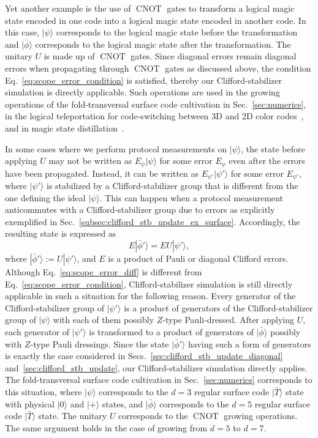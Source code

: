 \documentclass[
 reprint,
 amsmath,amssymb,
 pra,superscriptaddress, nofootinbib
]{revtex4-2}
\theoremstyle{definition}
\theoremstyle{plain}
\newcommand{\CNOT}{\operatorname{CNOT}}
\begin{document}
Yet another example is the use of $\CNOT$ gates to transform a logical magic state encoded in one code into a logical magic state encoded in another code. 
In this case, $|\psi\rangle$ corresponds to the logical magic state before the transformation and $|\bar{\phi}\rangle$ corresponds to the logical magic state after the transformation. The unitary $U$ is made up of $\CNOT$ gates.
Since diagonal errors remain diagonal errors when propagating through $\CNOT$ gates as discussed above, the condition Eq.~\eqref{eq:scope_error_condition} is satisfied, thereby our Clifford-stabilizer simulation is directly applicable.
Such operations are used in the growing operations of the fold-transversal surface code cultivation in Sec.~\ref{sec:numerics}, in the logical teleportation for code-switching between 3D and 2D color codes~\cite{PhysRevResearch.7.023080,Heussen2025efficientfault}, and in magic state distillation~\cite{PhysRevA.71.022316,PhysRevA.86.032324,PhysRevA.86.052329,Litinski2019magicstate}. 

In some cases where we perform protocol measurements on $|\psi\rangle$, the state before applying $U$ may not be written as $E_{\psi}|\psi\rangle$ for some error $E_{\psi}$ even after the errors have been propagated. 
Instead, it can be written as $E_{\psi'}|\psi'\rangle$ for some error $E_{\psi'}$, where $|\psi'\rangle$ is stabilized by a Clifford-stabilizer group that is different from the one defining the ideal $|\psi\rangle$. 
This can happen when a protocol measurement anticommutes with a Clifford-stabilizer group due to errors as explicitly exemplified in Sec.~\ref{subsec:clifford_stb_update_ex_surface}. 
Accordingly, the resulting state is expressed as 
\begin{equation}
    E|\bar{\phi}'\rangle=EU|\psi'\rangle, 
    \label{eq:scope_error_diff}
\end{equation}
where $|\bar{\phi}'\rangle:=U|\psi'\rangle$, and $E$ is a product of Pauli or diagonal Clifford errors.
Although Eq.~\eqref{eq:scope_error_diff} is different from Eq.~\eqref{eq:scope_error_condition}, Clifford-stabilizer simulation is still directly applicable in such a situation for the following reason.
Every generator of the Clifford-stabilizer group of $|\psi'\rangle$ is a product of generators of the Clifford-stabilizer group of $|\psi\rangle$ with each of them possibly $Z$-type Pauli-dressed. 
After applying $U$, each generator of $|\psi'\rangle$ is transformed to a product of generators of $|\bar{\phi}\rangle$ possibly with $Z$-type Pauli dressings. 
Since the state $|\bar{\phi}'\rangle$ having such a form of generators is exactly the case considered in Secs.~\ref{sec:clifford_stb_update_diagonal} and~\ref{sec:clifford_stb_update}, our Clifford-stabilizer simulation directly applies.
The fold-transversal surface code cultivation in Sec.~\ref{sec:numerics} corresponds to this situation, where $|\psi\rangle$ corresponds to the $d=3$ regular surface code $|\bar{T}\rangle$ state with physical $|0\rangle$ and $|+\rangle$ states, and $|\bar{\phi}\rangle$ corresponds to the $d=5$ regular surface code $|\bar{T}\rangle$ state. The unitary $U$ corresponds to the $\CNOT$ growing operations. The same argument holds in the case of growing from $d=5$ to $d=7$.
\end{document}

